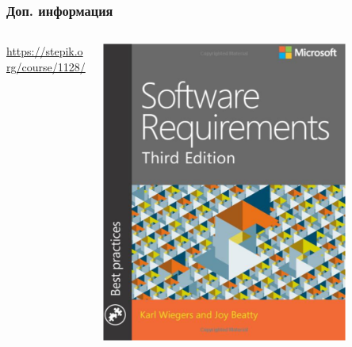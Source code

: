 \documentclass{../../slides-style}
\begin{document}
    \begin{frame}
        \frametitle{Доп. информация}
        \begin{columns}
            \begin{column}{0.5\textwidth}
                \url{https://stepik.org/course/1128/}
            \end{column}
            \begin{column}{0.5\textwidth}
                \strut
                \includegraphics[width=0.8\textwidth]{bookCover.png}
            \end{column}
        \end{columns}
    \end{frame}
\end{document}
